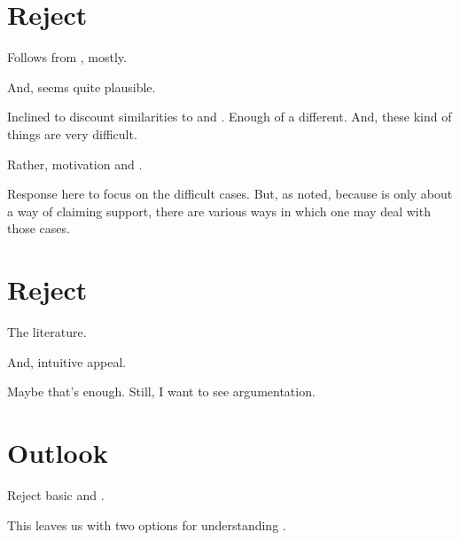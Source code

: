 \section{Reject \nI{}}
\label{sec:reject-ni}

\begin{note}
  Follows from \ideaCS{}, mostly.

  And, \ideaCS{} seems quite plausible.
\end{note}

\begin{note}
  Inclined to discount similarities to \citeauthor{Wright:2011wn} and \citeauthor{Weisberg:2010to}.
  Enough of a different.
  And, these kind of things are very difficult.
\end{note}

\begin{note}
  Rather, motivation and .
\end{note}

\begin{note}
  Response here to focus on the difficult cases.
  But, as noted, because \nI{} is only about a way of claiming support, there are various ways in which one may deal with those cases.
\end{note}

\section{Reject \ESU{}}
\label{sec:reject-esu}

\begin{note}
  The literature.

  And, intuitive appeal.

  Maybe that's enough.
  Still, I want to see argumentation.
\end{note}

\section{Outlook}
\label{sec:outlook}

\begin{note}
  Reject \AR{} basic and \ESU{}.

  This leaves us with two options for understanding .
\end{note}

\section{\AR{}}
\label{sec:ar-2}

